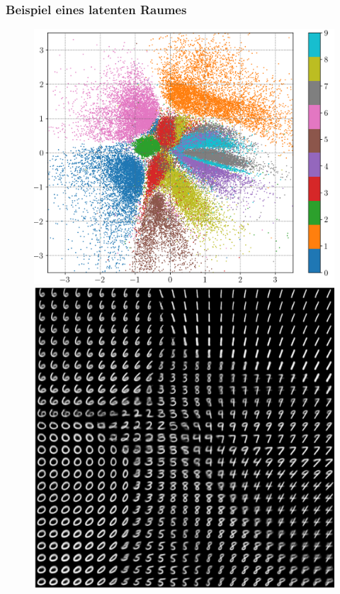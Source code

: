 \begin{frame}
	\frametitle{Beispiel eines latenten Raumes}
	
	\begin{figure}[h!]
		\centering
		\begin{minipage}{.6\textwidth}
			\includegraphics[scale=0.28]{Bilder/latent_space_2D.png}
		\end{minipage}%
		\begin{minipage}{.5\textwidth}
			\includegraphics[scale=0.23]{Bilder/latent_space_2D_reconstructions.png}
		\end{minipage}
	\end{figure}
\end{frame}

